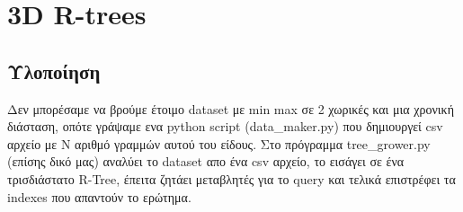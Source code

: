 \section{3D R-trees}

\subsection{Υλοποίηση}
Δεν μπορέσαμε να βρούμε έτοιμο dataset με min max σε 2 χωρικές και μια χρονική διάσταση, οπότε γράψαμε ενα python script (data\_maker.py) που δημιουργεί csv αρχείο με Ν αριθμό γραμμών αυτού του είδους.
Στο πρόγραμμα tree\_grower.py (επίσης δικό μας) αναλύει το dataset απο ένα csv αρχείο, το εισάγει σε ένα τρισδιάστατο R-Tree, έπειτα ζητάει μεταβλητές για το query και τελικά επιστρέφει τα indexes που απαντούν το ερώτημα.